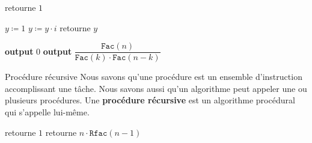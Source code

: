 \documentclass[16pt]{report}
\begin{document}
\begin{multicols*}{2}
        \begin{algorithm}[H]
            \caption{Procédure \texttt{Fac($n$)} \label{alg:four}}
                        \SetAlgoLined
                        \DontPrintSemicolon
                         {
                            retourne $1$ \; 
                        }
                        {
                            $y \coloneqq 1$ \; 
                               {
                                $y \coloneqq y \cdot i$ \;
                            }
                            retourne $y$

                        }
        \end{algorithm}
 
        \begin{algorithm}[H]
            \caption{Algorithme pour calculer \texttt{$C(n, k)$} \label{alg:five}}
                        \SetAlgoLined
                        \DontPrintSemicolon
                         {
                            \textbf{output } $0$ \; 
                        }
                            {\textbf{output} $\dfrac{\texttt{Fac}(n)}{\texttt{Fac}(k)\cdot\texttt{Fac}(n-k)}$}
                        

        \end{algorithm}
        \begin{Definitionx}{Procédure récursive}{}
            Nous savons qu'une procédure est un ensemble d'instruction accomplissant une tâche. 
            Nous savons aussi qu'un algorithme peut appeler une ou plusieurs procédures. 
            Une \textbf{procédure récursive} est un algorithme procédural qui s'appelle lui-même.   
        \end{Definitionx}

        \begin{algorithm}[H]
            \caption{Procédure récurisve \texttt{RFac($n$)} \label{alg:four2}}
                        \SetAlgoLined
                        \DontPrintSemicolon
                         {
                            retourne $1$ \; 
                        }
                            { 
                                retourne $n \cdot \texttt{Rfac}(n-1)$
                            }
        \end{algorithm}

\end{multicols*}
\end{document}
